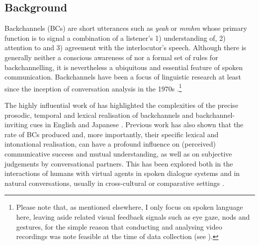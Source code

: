 \subsection{Background}\label{BCFP_BC_background}

Backchannels (BCs) are short utterances such as \emph{yeah} or \emph{mmhm} whose primary function is to signal a combination of a listener’s 1) understanding of, 2) attention to and 3) agreement with the interlocutor’s speech. Although there is generally neither a conscious awareness of nor a formal set of rules for backchannelling, it is nevertheless a ubiquitous and essential feature of spoken communication. Backchannels have been a focus of linguistic research at least since the inception of conversation analysis in the 1970s \citep{clarkContributingDiscourse1989, ehlichInterjektionen1986, jeffersonNotesSystematicDeployment1984, schegloffDiscourseInteractionalAchievement1982, whiteBackchannelsCulturesStudy1989,fries1952structure,birdwhistell1962critical,yngveGettingWordEdgewise1970,kendonFunctionsGazedirectionSocial1967}.\footnote{Please note that, as mentioned elsewhere, I only focus on spoken language here, leaving aside related visual feedback signals such as eye gaze, nods and gestures, for the simple reason that conducting and analysing video recordings was note feasible at the time of data collection (see ).}

The highly influential work of \citet{wardProsodicFeaturesWhich2000} has highlighted the complexities of the precise prosodic, temporal and lexical realisation of backchannels and backchan\-nel-inviting cues in English and Japanese \citep[see also e.g.][]{wardIssuesTranscriptionEnglish2000,wardProsodicPatternsEnglish2019,wardLearningShowYou2007}. Previous work has also shown that the rate of BCs produced and, more importantly, their specific lexical and intonational realisation, can have a profound influence on (perceived) communicative success and mutual understanding, as well as on subjective judgements by conversational partners. This has been explored both in the interactions of humans with virtual agents in spoken dialogue systems \citep{fujieConversationRobotBackchannel2004a,wardChallengesBuildingHighlyinteractive2016,wardResponsiveDialogSystem1999} and in natural conversations, usually in cross-cultural or comparative settings \citep[e.g.][]{cutroneCaseStudyExamining2005,cutroneCrossculturalExaminationBackchannel2014,dingemanseTextTalkHarnessing2022,liBackchannelResponsesMisleading2006,tottieConversationalStyleBritish1991,xudongUseListenerResponses2008,youngIdentifyingUnitsInteraction2004}.

